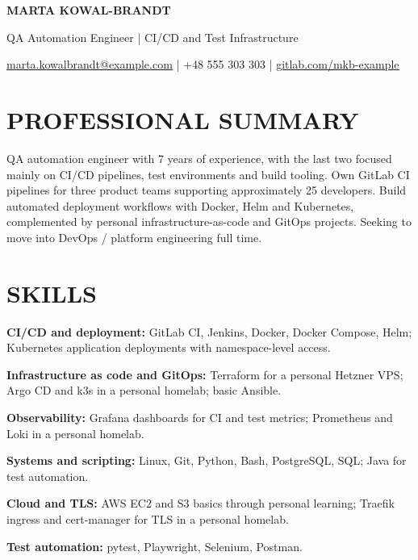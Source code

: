 \documentclass[11pt,a4paper]{article}
\newcommand{\cvsection}[1]{\section*{#1}}
\begin{document}
{\Huge\bfseries\color{primarycolor} MARTA KOWAL-BRANDT}\par
{\large\color{accentcolor} QA Automation Engineer | CI/CD and Test Infrastructure}\par
{\small \href{mailto:marta.kowalbrandt@example.com}{marta.kowalbrandt@example.com} | +48 555 303 303 | \href{https://gitlab.com/mkb-example}{gitlab.com/mkb-example}}\par

\cvsection{PROFESSIONAL SUMMARY}
QA automation engineer with 7 years of experience, with the last two focused mainly on CI/CD pipelines, test environments and build tooling. Own GitLab CI pipelines for three product teams supporting approximately 25 developers. Build automated deployment workflows with Docker, Helm and Kubernetes, complemented by personal infrastructure-as-code and GitOps projects. Seeking to move into DevOps / platform engineering full time.

\cvsection{SKILLS}
\textbf{CI/CD and deployment:} GitLab CI, Jenkins, Docker, Docker Compose, Helm; Kubernetes application deployments with namespace-level access.\par
\textbf{Infrastructure as code and GitOps:} Terraform for a personal Hetzner VPS; Argo CD and k3s in a personal homelab; basic Ansible.\par
\textbf{Observability:} Grafana dashboards for CI and test metrics; Prometheus and Loki in a personal homelab.\par
\textbf{Systems and scripting:} Linux, Git, Python, Bash, PostgreSQL, SQL; Java for test automation.\par
\textbf{Cloud and TLS:} AWS EC2 and S3 basics through personal learning; Traefik ingress and cert-manager for TLS in a personal homelab.\par
\textbf{Test automation:} pytest, Playwright, Selenium, Postman.
\end{document}

